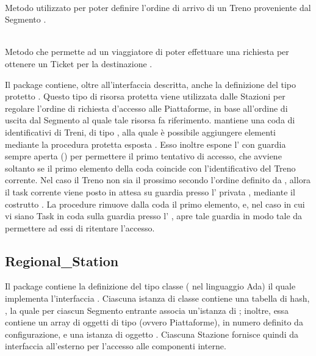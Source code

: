 \begin{description}
		\item {} \\
		Metodo utilizzato per poter definire l'ordine di arrivo di un Treno  proveniente dal Segmento .	
	
		\item {} \\
		Metodo che permette ad un viaggiatore  di poter effettuare una richiesta per ottenere un Ticket per la destinazione .
	\end{description}
	
	Il package contiene, oltre all'interfaccia descritta, anche la definizione del tipo protetto . Questo tipo di risorsa protetta viene utilizzata dalle Stazioni per regolare l'ordine di richiesta d'accesso alle Piattaforme, in base all'ordine di uscita dal Segmento al quale tale risorsa fa riferimento.  mantiene una coda  di identificativi di Treni, di tipo , alla quale è possibile aggiungere elementi mediante la procedura protetta esposta . Esso inoltre espone l'  con guardia sempre aperta () per permettere il primo tentativo di accesso, che avviene soltanto se il primo elemento della coda coincide con l'identificativo del Treno corrente. Nel caso il Treno non sia il prossimo secondo l'ordine definito da , allora il task corrente viene posto in attesa su guardia presso l' privata , mediante il costrutto . La procedure  rimuove dalla coda il primo elemento, e, nel caso in cui vi siano Task in coda sulla guardia presso l' , apre tale guardia in modo tale da permettere ad essi di ritentare l'accesso.

\subsection{Regional\_Station}
	
	Il package  contiene la definizione del tipo classe ( nel linguaggio Ada)  il quale implementa l'interfaccia . Ciascuna istanza di classe  contiene una tabella di hash, , la quale per ciascun Segmento entrante associa un'istanza di ; inoltre, essa contiene un array di oggetti di tipo  (ovvero Piattaforme), in numero definito da configurazione, e una istanza di oggetto . 
	Ciascuna Stazione fornisce quindi da interfaccia all'esterno per l'accesso alle componenti interne.
	

